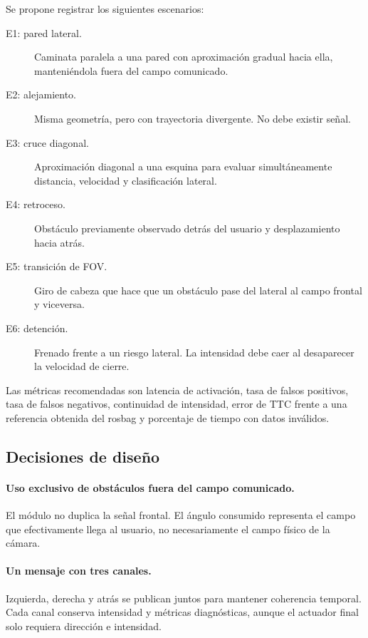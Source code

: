 Se propone registrar los siguientes escenarios:
%
\begin{description}
  \item[E1: pared lateral.] Caminata paralela a una pared con aproximación
    gradual hacia ella, manteniéndola fuera del campo comunicado.

  \item[E2: alejamiento.] Misma geometría, pero con trayectoria divergente.
    No debe existir señal.

  \item[E3: cruce diagonal.] Aproximación diagonal a una esquina para evaluar
    simultáneamente distancia, velocidad y clasificación lateral.

  \item[E4: retroceso.] Obstáculo previamente observado detrás del usuario y
    desplazamiento hacia atrás.

  \item[E5: transición de FOV.] Giro de cabeza que hace que un obstáculo pase
    del lateral al campo frontal y viceversa.

  \item[E6: detención.] Frenado frente a un riesgo lateral. La intensidad debe
    caer al desaparecer la velocidad de cierre.
\end{description}

Las métricas recomendadas son latencia de activación, tasa de falsos
positivos, tasa de falsos negativos, continuidad de intensidad, error de TTC
frente a una referencia obtenida del rosbag y porcentaje de tiempo con datos
inválidos.

\subsection{Decisiones de diseño}
\label{subsec:sa-decisions}

\paragraph{Uso exclusivo de obstáculos fuera del campo comunicado.}
El módulo no duplica la señal frontal. El ángulo consumido representa el campo
que efectivamente llega al usuario, no necesariamente el campo físico de la
cámara.

\paragraph{Un mensaje con tres canales.}
Izquierda, derecha y atrás se publican juntos para mantener coherencia
temporal. Cada canal conserva intensidad y métricas diagnósticas, aunque el
actuador final solo requiera dirección e intensidad.

